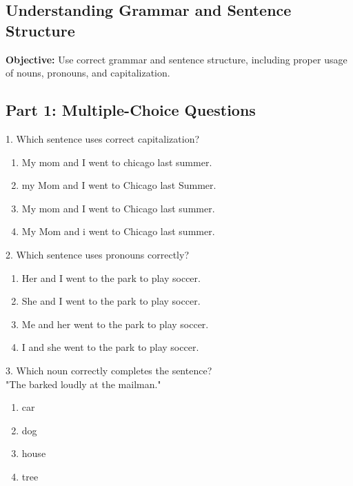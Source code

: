 \documentclass[12pt]{article}
\begin{document}
\subsection*{Understanding Grammar and Sentence Structure}
\onehalfspacing

\begin{tcolorbox}[colframe=black!40, colback=gray!0, title=Learning Objective]
\textbf{Objective:} Use correct grammar and sentence structure, including proper usage of nouns, pronouns, and capitalization.
\end{tcolorbox}

\subsection*{Part 1: Multiple-Choice Questions}

1. Which sentence uses correct capitalization? \\
\begin{enumerate}[label=\Alph*.]
    \item My mom and I went to chicago last summer.  
    \item my Mom and I went to Chicago last Summer.  
    \item My mom and I went to Chicago last summer.  
    \item My Mom and i went to Chicago last summer.  
\end{enumerate}

\vspace{1cm}

2. Which sentence uses pronouns correctly?\\
\begin{enumerate}[label=\Alph*.]
    \item Her and I went to the park to play soccer.  
    \item She and I went to the park to play soccer.  
    \item Me and her went to the park to play soccer.  
    \item I and she went to the park to play soccer.  
\end{enumerate}

\vspace{1cm}

3. Which noun correctly completes the sentence?\\
"The \underline{\hspace{4cm}} barked loudly at the mailman."\\
\begin{enumerate}[label=\Alph*.]
    \item car  
    \item dog  
    \item house  
    \item tree  
\end{enumerate}
\end{document}
